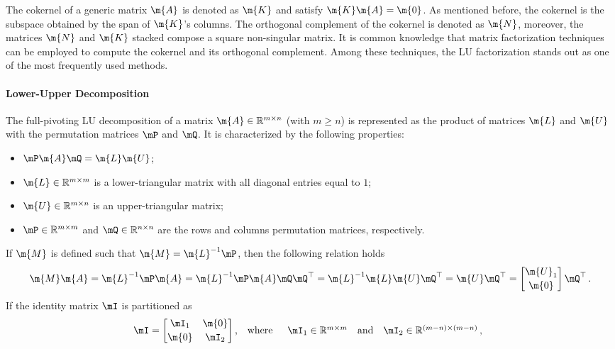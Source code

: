 The cokernel of a generic matrix $\m{A}$ is denoted as $\m{K}$ and satisfy $\m{K}\m{A} = \m{0}$. As mentioned before, the cokernel is the subspace obtained by the span of $\m{K}$'s columns. The orthogonal complement of the cokernel is denoted as $\m{N}$, moreover, the matrices $\m{N}$ and $\m{K}$ stacked compose a square non-singular matrix. It is common knowledge that matrix factorization techniques can be employed to compute the cokernel and its orthogonal complement. Among these techniques, the \ac{LU} factorization stands out as one of the most frequently used methods.

\paragraph{Lower-Upper Decomposition}

The full-pivoting \ac{LU} decomposition of a matrix $\m{A} \in \mathbb{R}^{m \times n}$ (with $m\geq n$) is represented as the product of matrices $\m{L}$ and $\m{U}$ with the permutation matrices $\mP$ and $\mQ$. It is characterized by the following properties:
%
\begin{itemize}
  \setlength{\itemsep}{0.0em}
  \item $\mP\m{A}\mQ = \m{L}\m{U}$;
  \item $\m{L} \in \mathbb{R}^{m \times m}$ is a lower-triangular matrix with all diagonal entries equal to $1$;
  \item $\m{U} \in \mathbb{R}^{m \times n}$ is an upper-triangular matrix;
  \item $\mP \in \mathbb{R}^{m \times m}$ and $\mQ \in \mathbb{R}^{n \times n}$ are the rows and columns permutation matrices, respectively.
\end{itemize}
%
If $\m{M}$ is defined such that $\m{M} = \m{L}^{-1}\mP$, then the following relation holds
%
\begin{equation*}
    \m{M}\m{A}
    = \m{L}^{-1}\mP\m{A}
    = \m{L}^{-1}\mP\m{A}\mQ\mQ^\top
    = \m{L}^{-1}\m{L}\m{U}\mQ^\top
    = \m{U}\mQ^\top
    = \begin{bmatrix} \m{U}_1 \\[0.2em] \m{0} \end{bmatrix}\mQ^\top \, \text{.}
\end{equation*}
%
If the identity matrix $\mI$ is partitioned as
%
\begin{equation*}
  \mI = \begin{bmatrix}
    \mI_1 & \m{0} \\[0.2em]
    \m{0} & \mI_2
  \end{bmatrix} \text{,}
  \quad \text{where} \quad
  \begin{array}{l}
    \mI_1 \in \mathbb{R}^{m \times m} \quad \text{and} \quad
    \mI_2 \in \mathbb{R}^{(m-n)\times(m-n)} \, \text{,}
  \end{array}
\end{equation*}
